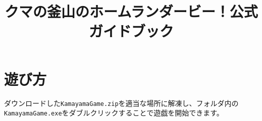 \documentclass[a4paper,11pt]{jsarticle}
\theoremstyle{definition}
\begin{document}
\date{}
\title{クマの釜山のホームランダービー！公式ガイドブック}

\maketitle



\section{遊び方}
ダウンロードした\verb|KamayamaGame.zip|を適当な場所に解凍し、フォルダ内の\verb|KamayamaGame.exe|をダブルクリックすることで遊戯を開始できます。




\end{document}

